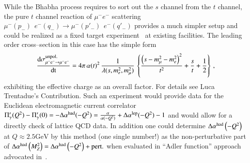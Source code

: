 \documentclass[epj,onecolumn]{webofc}
\newcommand{\dalh}{\Delta \alpha^{\rm had}}
\newcommand{\gv}{\mbox{GeV}}
\newcommand{\mbo}[1]{$#1$ }
\newcommand{\D}{\rm d }
\newcommand{\bea}{\begin{eqnarray}}
\newcommand{\eea}{\end{eqnarray}}
\begin{document}
While the Bhabha process requires to sort out the $s$ channel from
the $t$ channel, the pure $t$ channel reaction of $\mu^- e^-$ scattering $ \mu^-(p_-)\:\:e^-(q_-)
\to \mu^-(p'_-)\:\:e^-(q'_-)$ provides a much simpler setup and could be
realized as a fixed target
experiment~\cite{Abbiendi:2016xup} at existing
facilities. The leading order cross--section in this case has the
simple form
\bea
\frac{\D \sigma^{\rm unpol.}_{\mu^-e^- \to \mu^-e^-}}{\D
t}=4\pi\,{ \alpha(t)^2}\,\frac{1}{\lambda(s,m_e^2,m_\mu^2) }\,\left\{\frac{\left(s-m_\mu^2-m_e^2\right)^2}{t^2}+\frac{s}{t}+\frac12\right\}\,,
\eea
exhibiting the effective charge as an overall factor. For details see
Luca Trentadue's Contribution. Such an experiment would provide data
for the Euclidean electromagnetic current correlator
$\Pi'_\gamma(Q^2)-\Pi'_\gamma(0)=-\dalh(-Q^2)=\frac{\alpha}{\alpha(-Q^2)}+\Delta
\alpha^{\rm lep}(-Q^2)-1$ and would allow for a directly check of lattice QCD data.
In addition one could determine $\dalh\left(-Q^2\right)$
at $ Q \approx 2.5\gv$ by this method (one single number!) as the
non-perturbative part of \mbo{\dalh
\left(M_Z^2\right)=\dalh\left(-Q^2\right)+\mathrm{pert.}} when evaluated in ``Adler
function'' approach advocated in~\cite{Jegerlehner:2008rs}.
\end{document}
